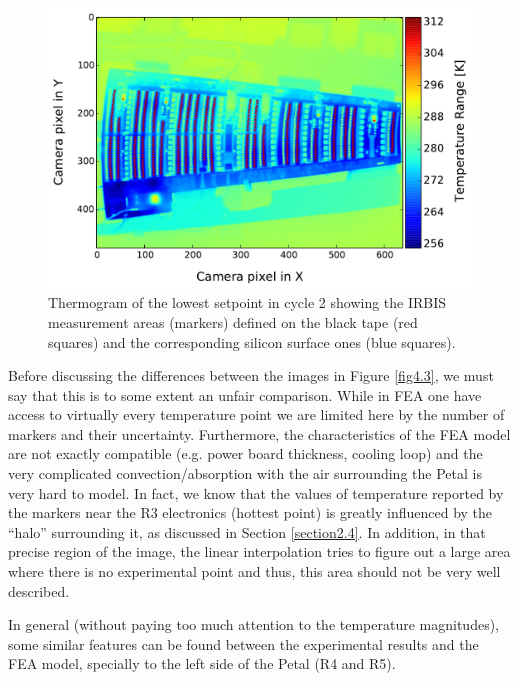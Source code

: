 		\begin{figure}[ht!]
			\centering
			\captionsetup{justification=centering,margin=2cm}
			\includegraphics[scale=0.65]{Figures/Chapter04/thermo_Temp_20170803154926.pdf}
			\caption{Thermogram of the lowest setpoint in cycle 2 showing the IRBIS measurement areas (markers) defined on the black tape (red squares) and the corresponding silicon surface ones (blue squares).}\label{fig4.2}
		\end{figure}
	
		Before discussing the differences between the images in Figure \ref{fig4.3}, we must say that this is to some extent an unfair comparison. While in FEA one have access to virtually every temperature point we are limited here by the number of markers and their uncertainty. Furthermore, the characteristics of the FEA model are not exactly compatible (e.g. power board thickness, cooling loop) and the very complicated convection/absorption with the air surrounding the Petal is very hard to model. In fact, we know that the values of temperature reported by the markers near the R3 electronics (hottest point) is greatly influenced by the “halo” surrounding it, as discussed in Section \ref{section2.4}. In addition, in that precise region of the image, the linear interpolation tries to figure out a large area where there is no experimental point and thus, this area should not be very well described.
		
		In general (without paying too much attention to the temperature magnitudes), some similar features can be found between the experimental results and the FEA model, specially to the left side of the Petal (R4 and R5).
		
